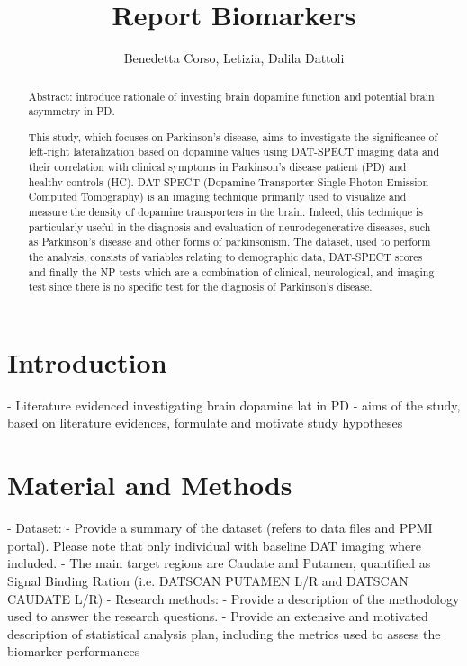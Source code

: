 \documentclass[]{article}
\title{Report Biomarkers}
\author{Benedetta Corso, Letizia, Dalila Dattoli}
\begin{document}
\maketitle

\begin{abstract}
Abstract: introduce rationale of investing brain dopamine function and potential brain asymmetry in PD.

This study, which focuses on Parkinson's disease, aims to investigate the significance of left-right lateralization based on dopamine values using DAT-SPECT imaging data and their correlation with clinical symptoms in Parkinson’s disease patient (PD) and healthy controls (HC). DAT-SPECT (Dopamine Transporter Single Photon Emission Computed Tomography) is an imaging technique primarily used to visualize and measure the density of dopamine transporters in the brain.  Indeed, this technique is particularly useful in the diagnosis and evaluation of neurodegenerative diseases, such as Parkinson's disease and other forms of parkinsonism. The dataset, used to perform the analysis, consists of variables relating to demographic data, DAT-SPECT scores and finally the NP tests which are a combination of clinical, neurological, and imaging test since there is no specific test for the diagnosis of Parkinson’s disease.

\end{abstract}

\section{Introduction}

- Literature evidenced investigating brain dopamine lat in PD
- aims of the study, based on literature evidences, 
formulate and motivate study hypotheses

\section{Material and Methods}

- Dataset:
\newline
	- Provide a summary of the dataset (refers to data files and PPMI
	portal). Please note that only individual with baseline DAT imaging 
	where included.
\newline
	- The main target regions are Caudate and Putamen, quantified as 
	Signal Binding Ration (i.e. DATSCAN PUTAMEN L/R and 
	DATSCAN CAUDATE L/R)
\newline
- Research methods:
\newline
	- Provide a description of the methodology used to answer the research 
	questions. 
	\newline
	- Provide an extensive and motivated description of statistical analysis plan, including the metrics used to assess the biomarker 
	performances
\end{document}
